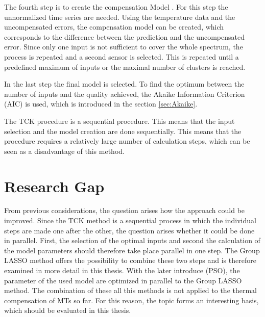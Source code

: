 The fourth step is to create the compensation Model \cite{Mayr_2018}. For this step the unnormalized time series are needed.  Using the temperature data and the uncompensated errors, the compensation model can be created, which corresponds to the difference between the prediction and the uncompensated error. Since only one input is not sufficient to cover the whole spectrum, the process is repeated and a second sensor is selected. This is repeated until a predefined maximum of inputs or the maximal number of clusters is reached. 

In the last step the final model is selected. To find the optimum between the number of inputs and the quality achieved, the Akaike Information Criterion (AIC) is used, which is introduced in the section \ref{sec:Akaike}.

The TCK procedure is a sequential procedure. This means that the input selection and the model creation are done sequentially. This means that the procedure requires a relatively large number of calculation steps, which can be seen as a disadvantage of this method.



\section{Research Gap}
\label{sec:researchgap}

From previous considerations, the question arises how the approach could be improved. Since the TCK method is a sequential process in which the individual steps are made one after the other, the question arises whether it could be done in parallel. First, the selection of the optimal inputs and second the calculation of the model parameters should therefore take place parallel in one step. The Group LASSO method offers the possibility to combine these two steps and is therefore examined in more detail in this thesis. With the later introduce (PSO), the parameter of the used model are optimized in parallel to the Group LASSO method. The combination of these all this methods is not applied to the thermal compensation of MTs so far. For this reason, the topic forms an interesting basis, which should be evaluated in this thesis.


